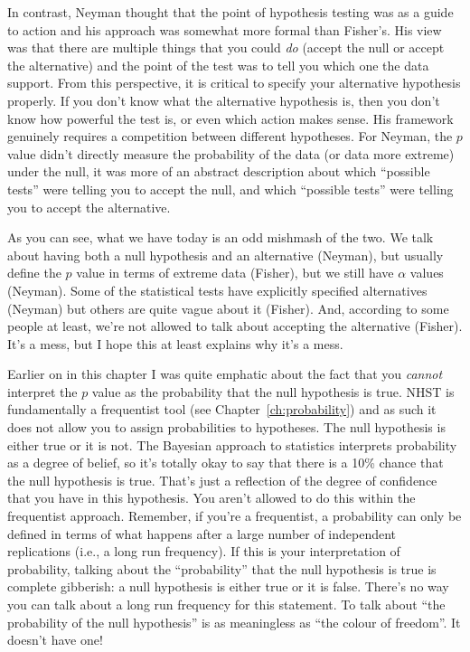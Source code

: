 In contrast, Neyman thought that the point of hypothesis testing was as a guide to action and his approach was somewhat more formal than Fisher's. His view was that there are multiple things that you could {\it do} (accept the null or accept the alternative) and the point of the test was to tell you which one the data support. From this perspective, it is critical to specify your alternative hypothesis properly. If you don't know what the alternative hypothesis is, then you don't know how powerful the test is, or even which action makes sense. His framework genuinely requires a competition between different hypotheses. For Neyman, the $p$ value didn't directly measure the probability of the data (or data more extreme) under the null, it was more of an abstract description about which ``possible tests'' were telling you to accept the null, and which ``possible tests'' were telling you to accept the alternative.

As you can see, what we have today is an odd mishmash of the two. We talk about having both a null hypothesis and an alternative (Neyman), but usually define the $p$ value in terms of extreme data (Fisher), but we still have $\alpha$ values (Neyman). Some of the statistical tests have explicitly specified alternatives (Neyman) but others are quite vague about it (Fisher). And, according to some people at least, we're not allowed to talk about accepting the alternative (Fisher). It's a mess, but I hope this at least explains why it's a mess.


Earlier on in this chapter I was quite emphatic about the fact that you {\it cannot} interpret the $p$ value as the probability that the null hypothesis is true. NHST is fundamentally a frequentist tool (see Chapter~\ref{ch:probability}) and as such it does not allow you to assign probabilities to hypotheses. The null hypothesis is either true or it is not. The Bayesian approach to statistics interprets probability as a degree of belief, so it's totally okay to say that there is a 10\% chance that the null hypothesis is true. That's just a reflection of the degree of confidence that you have in this hypothesis. You aren't allowed to do this within the frequentist approach. Remember, if you're a frequentist, a probability can only be defined in terms of what happens after a large number of independent replications (i.e., a long run frequency). If this is your interpretation of probability, talking about the ``probability'' that the null hypothesis is true is complete gibberish: a null hypothesis is either true or it is false. There's no way you can talk about a long run frequency for this statement. To talk about ``the probability of the null hypothesis'' is as meaningless as ``the colour of freedom''. It doesn't have one!

